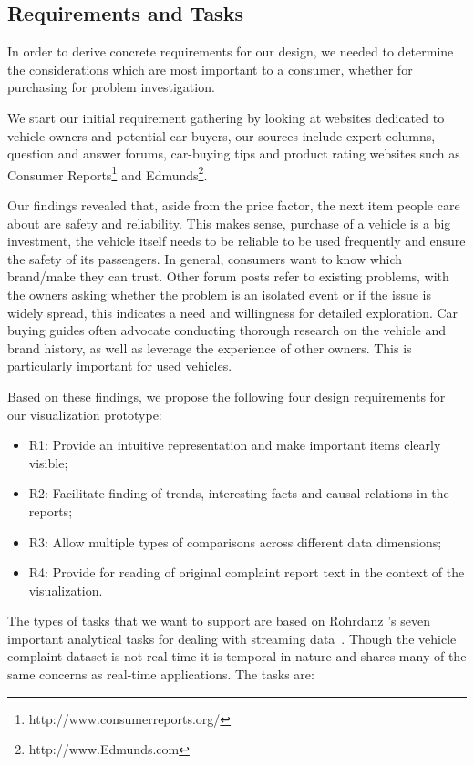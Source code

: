 \subsection{Requirements and Tasks}
In order to derive concrete requirements for our design, we needed to determine
the considerations which are most important to a consumer, whether for
purchasing for problem investigation.

We start our initial requirement gathering by looking at websites dedicated to 
vehicle owners and potential car buyers, our sources include expert columns, 
question and answer forums, car-buying tips and product rating websites such 
as Consumer Reports\footnote{http://www.consumerreports.org/} and
Edmunds\footnote{http://www.Edmunds.com}. 

Our findings revealed that, aside from the price factor, the next item people
care  about are safety and reliability.
This makes sense, purchase of a vehicle is a big investment, the vehicle itself 
needs to be reliable to be used frequently and ensure the safety of its passengers. 
In general, consumers want to know which brand/make they can trust. Other forum
posts refer to existing problems, with the owners asking whether the problem is an 
isolated event or if the issue is widely spread, this indicates a need and
willingness for detailed exploration. Car buying guides often advocate conducting thorough 
research on the vehicle and brand history, as well as leverage the experience of 
other owners. This is particularly important for used vehicles.
 
Based on these findings, we propose the following four design requirements for
our visualization prototype:
\begin{itemize}[noitemsep]
  \item R1: Provide an intuitive representation and make important items clearly
  visible;
  \item R2: Facilitate finding of trends, interesting facts and causal relations
  in the reports;
  \item R3: Allow multiple types of comparisons across different data
  dimensions;
  \item R4: Provide for reading of original complaint report text in the context
  of the visualization.
\end{itemize}

The types of tasks that we want to support are based on Rohrdanz \etal's seven
important analytical tasks for dealing with streaming data~\cite{ROH2011a}. 
Though the vehicle complaint dataset is not real-time it is temporal in nature
and shares many of the same concerns as real-time applications. The tasks are:

